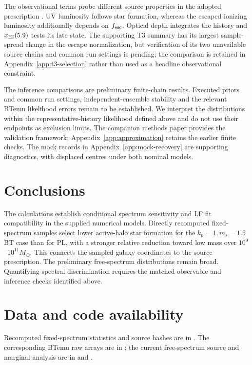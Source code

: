 The observational terms probe different source properties in the adopted prescription \cite{Park2019}. UV luminosity follows star formation, whereas the escaped ionizing luminosity additionally depends on $f_{\rm esc}$. Optical depth integrates the history and $x_{\rm HI}(5.9)$ tests its late state. The supporting T3 summary has its largest sample-spread change in the escape normalization, but verification of its two unavailable source chains and common run settings is pending; the comparison is retained in Appendix~\ref{app:t3-selection} rather than used as a headline observational constraint.

The inference comparisons are preliminary finite-chain results. Executed priors and common run settings, independent-ensemble stability and the relevant BTemu likelihood errors remain to be established. We interpret the distributions within the representative-history likelihood defined above and do not use their endpoints as exclusion limits. The companion methods paper provides the validation framework; Appendix~\ref{app:approximation} retains the earlier finite checks. The mock records in Appendix~\ref{app:mock-recovery} are supporting diagnostics, with displaced centres under both nominal models.

\section{Conclusions}\label{conclusions}

The calculations establish conditional spectrum sensitivity and LF fit compatibility in the supplied numerical models. Directly recomputed fixed-spectrum samples select lower active-halo star formation for the $k_p=1,m_s=1.5$ BT case than for PL, with a stronger relative reduction toward low mass over $10^9$--$10^{11}M_\odot$. This connects the sampled galaxy coordinates to the source prescription. The preliminary free-spectrum distributions remain broad. Quantifying spectral discrimination requires the matched observable and inference checks identified above.

\section*{Data and code availability}

Recomputed fixed-spectrum statistics and source hashes are in . The corresponding BTemu raw arrays are in ; the current free-spectrum source and marginal analysis are in  and .


